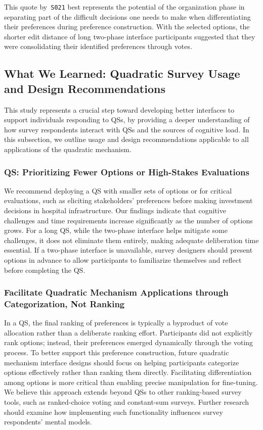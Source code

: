 This quote by~\texttt{S021} best represents the potential of the organization phase in separating part of the difficult decisions one needs to make when differentiating their preferences during preference construction. With the selected options, the shorter edit distance of long two-phase interface participants suggested that they were consolidating their identified preferences through votes.



\subsection{What We Learned: Quadratic Survey Usage and Design Recommendations}
This study represents a crucial step toward developing better interfaces to support individuals responding to QSs, by providing a deeper understanding of how survey respondents interact with QSs and the sources of cognitive load. In this subsection, we outline usage and design recommendations applicable to all applications of the quadratic mechanism.

\subsubsection{QS: Prioritizing Fewer Options or High-Stakes Evaluations}
We recommend deploying a QS with smaller sets of options or for critical evaluations, such as eliciting stakeholders' preferences before making investment decisions in hospital infrastructure. Our findings indicate that cognitive challenges and time requirements increase significantly as the number of options grows. For a long QS, while the two-phase interface helps mitigate some challenges, it does not eliminate them entirely, making adequate deliberation time essential. If a two-phase interface is unavailable, survey designers should present options in advance to allow participants to familiarize themselves and reflect before completing the QS.

\subsubsection{Facilitate Quadratic Mechanism Applications through Categorization, Not Ranking}
In a QS, the final ranking of preferences is typically a byproduct of vote allocation rather than a deliberate ranking effort. Participants did not explicitly rank options; instead, their preferences emerged dynamically through the voting process. To better support this preference construction, future quadratic mechanism interface designs should focus on helping participants categorize options effectively rather than ranking them directly. Facilitating differentiation among options is more critical than enabling precise manipulation for fine-tuning. We believe this approach extends beyond QSs to other ranking-based survey tools, such as ranked-choice voting and constant-sum surveys. Further research should examine how implementing such functionality influences survey respondents' mental models.



